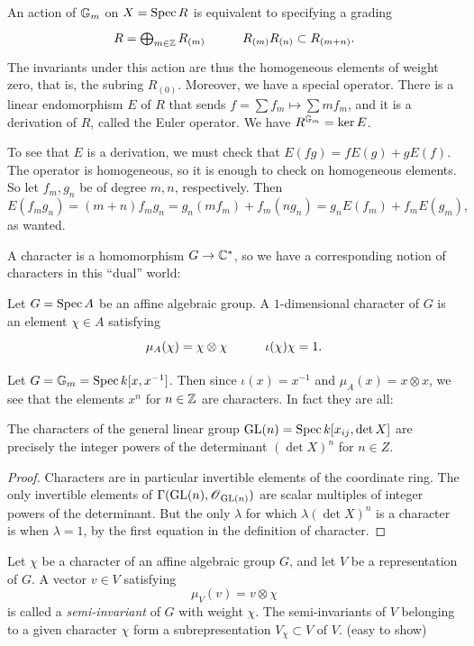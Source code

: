 \documentclass[11pt, english]{article}
\begin{document}
\begin{example}
An action of $\mathbb{G}_m$ on $X = \operatorname{Spec} R$ is equivalent to specifying a grading
\[
\xymatrix{
R = \bigoplus_{m \in \Z} R_{(m)} & R_{(m)}R_{(n)} \subset R_{(m+n)}.
}
\]
The invariants under this action are thus the homogeneous elements of weight zero, that is, the subring $R_{(0)}$. Moreover, we have a special operator. There is a linear endomorphism $E$ of $R$ that sends $f = \sum f_m \mapsto \sum m f_m$, and it is a derivation of $R$, called the Euler operator. We have $R^{\mathbb{G}_m}=\ker E$.

To see that $E$ is a derivation, we must check that $E(fg)=fE(g)+gE(f)$. The operator is homogeneous, so it is enough to check on homogeneous elements. So let $f_m,g_n$ be of degree $m,n$, respectively. Then
\[
E(f_mg_n)=(m+n)f_mg_n = g_n(mf_m)+f_m(ng_n)=g_nE(f_m)+f_mE(g_m),
\]
as wanted.
\end{example}


A character is a homomorphism $G \to \mathbb{C}^\ast$, so we have a corresponding notion of characters in this ``dual'' world:

\begin{defi}
Let $G=\operatorname{Spec} A$ be an affine algebraic group. A $1$-dimensional character of $G$ is an element $\chi \in A$ satisfying
\[
\xymatrix{
\mu_A(\chi) = \chi \otimes \chi & \iota(\chi)\chi = 1.
}
\]
\end{defi}
\begin{example}
 Let $G = \mathbb{G}_m = \operatorname{Spec} k[x,x^{-1}]$. Then since $\iota(x)=x^{-1}$ and $\mu_A(x) = x \otimes x$, we see that the elements $x^n$ for $n \in \mathbb{Z}$ are characters. In fact they are all:
\end{example}


\begin{lemma}
\label{chargl}
The characters of the general linear group $\operatorname{GL}(n) = \operatorname{Spec} k[x_{ij}, \det X]$ are precisely the integer powers of the determinant $(\det X)^n$ for $n \in Z$.   
\end{lemma}
\begin{proof}
Characters are in particular invertible elements of the coordinate ring. The only invertible elements of $\Gamma(\operatorname{GL}(n),\operatorname{\mathscr{O}}_{\operatorname{GL}(n)})$ are scalar multiples of integer powers of the determinant. But the only $\lambda$ for which $\lambda( \det X)^n$ is a character is when $\lambda=1$, by the first equation in the definition of character.
\end{proof}

\begin{defi}
  Let $\chi$ be a character of an affine algebraic group $G$, and let $V$ be a representation of $G$. A vector $v \in V$ satisfying $$\mu_V(v) = v \otimes \chi$$ is called a \emph{semi-invariant} of $G$ with weight $\chi$. The semi-invariants of $V$ belonging to a given character $\chi$ form a subrepresentation $V_\chi \subset V$ of $V$. (easy to show)
\end{defi}
\end{document}
